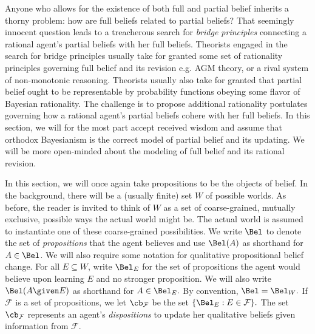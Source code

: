 Anyone who allows for the existence of both full and partial belief inherits a
thorny problem: how are full beliefs related to partial beliefs? That seemingly
innocent question leads to a treacherous search for {\em bridge principles}
connecting a rational agent's partial beliefs with her full beliefs. Theorists
engaged in the search for bridge principles usually take for granted some set of
rationality principles governing full belief and its revision e.g. AGM theory,
or a rival system of non-monotonic reasoning. Theorists usually also take for
granted that partial belief ought to be representable by probability functions
obeying some flavor of Bayesian rationality. The challenge is to propose
additional rationality postulates governing how a rational agent's partial
beliefs cohere with her full beliefs. In this section, we will for the most part
accept received wisdom and assume that orthodox Bayesianism is the correct model
of partial belief and its updating. We will be more open-minded about the
modeling of full belief and its rational revision. 

In this section, we will once again take propositions to be the objects of
belief. In the background, there will be a (usually finite) set $W$ of possible
worlds. As before, the reader is invited to think of $W$ as a set of
coarse-grained, mutually exclusive, possible ways the actual world might be. The
actual world is assumed to instantiate one of these coarse-grained
possibilities. We write $\Bel$ to denote the set of {\em propositions} that the
agent believes and use $\Bel(A)$ as shorthand for $A\in \Bel$. We will also
require some notation for qualitative propositional belief change. For all
$E\subseteq W$, write $\Bel_E$ for the set of propositions the agent would
believe upon learning $E$ and no stronger proposition. We will also write
$\Bel(A \given E)$ as shorthand for $A\in \Bel_E.$ By convention, $\Bel=
\Bel_W.$ If $\mathcal{F}$ is a set of propositions, we let $\cb_{\mathcal{F}}$
be the set $\{ \Bel_E : E \in \mathcal{F} \}.$ The set $\cb_{\mathcal{F}}$
represents an agent's {\em dispositions} to update her qualitative beliefs given
information from $\mathcal{F}$. 

